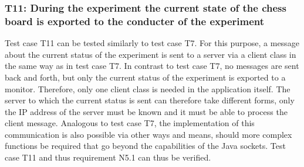 
\newpage

\subsubsection*{T11: During the experiment the current state of the chess board is exported to the conducter of the experiment}

Test case T11 can be tested similarly to test case T7. For this purpose, a message about the current status of the experiment is sent to a server via a client class in the same way as in test case T7. In contrast to test case T7, no messages are sent back and forth, but only the current status of the experiment is exported to a monitor. Therefore, only one client class is needed in the application itself. The server to which the current status is sent can therefore take different forms, only the IP address of the server must be known and it must be able to process the client message. Analogous to test case T7, the implementation of this communication is also possible via other ways and means, should more complex functions be required that go beyond the capabilities of the Java sockets. Test case T11 and thus requirement N5.1 can thus be verified.

